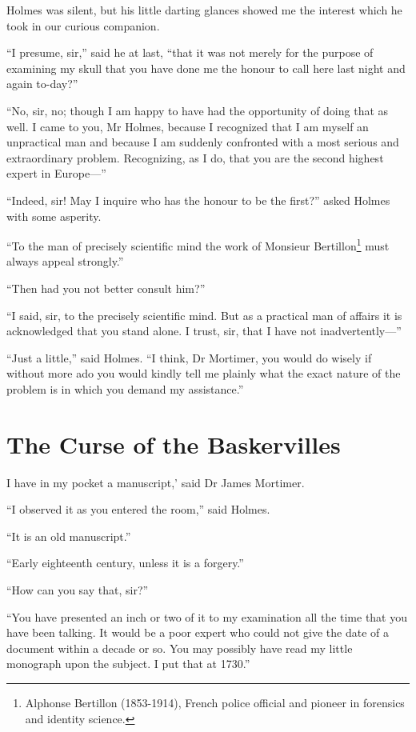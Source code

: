 \documentclass[paper=5.5in:8.5in,BCOR=7mm,twoside,DIV=calc,12pt,usegeometry,openany,chapterprefix,endperiod,headings=big]{scrbook} %
\begin{document}
Holmes was silent, but his little darting glances showed me the interest which he took in our curious companion.

\enquote{I presume, sir,} said he at last, \enquote{that it was not merely for the purpose of examining my skull that you have done me the honour to call here last night and again to-day?}

\enquote{No, sir, no; though I am happy to have had the opportunity of doing that as well. I came to you, Mr Holmes, because I recognized that I am myself an unpractical man and because I am suddenly confronted with a most serious and extraordinary problem. Recognizing, as I do, that you are the second highest expert in Europe---}

\enquote{Indeed, sir! May I inquire who has the honour to be the first?} asked Holmes with some asperity.

\enquote{To the man of precisely scientific mind the work of Monsieur Bertillon\footnote{Alphonse Bertillon (1853-1914), French police official and pioneer in forensics and identity science.} must always appeal strongly.}

\enquote{Then had you not better consult him?}

\enquote{I said, sir, to the precisely scientific mind. But as a practical man of affairs it is acknowledged that you stand alone. I trust, sir, that I have not inadvertently---}

\enquote{Just a little,} said Holmes. \enquote{I think, Dr Mortimer, you would do wisely if without more ado you would kindly tell me plainly what the exact nature of the problem is in which you demand my assistance.}

\chapter{The Curse of the Baskervilles}
\lettrine[ante=`,lines=1]{I}{} have in my pocket a manuscript,' said Dr James Mortimer.

\enquote{I observed it as you entered the room,} said Holmes.

\enquote{It is an old manuscript.}

\enquote{Early eighteenth century, unless it is a forgery.}

\enquote{How can you say that, sir?}

\enquote{You have presented an inch or two of it to my examination all the time that you have been talking. It would be a poor expert who could not give the date of a document within a decade or so. You may possibly have read my little monograph upon the subject. I put that at 1730.}
\end{document}
